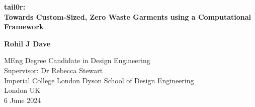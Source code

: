 \begin{titlepage}
    \begin{center}
        \vspace*{1cm}
        \Huge
        \textbf{tail0r: \\ Towards Custom-Sized, Zero Waste Garments using a Computational Framework}

 
        \vspace{1.5cm}
 
 
        \vfill
 
        
        \textbf{Rohil J Dave}
 
        \vspace{0.8cm}
 

 
        \Large
        MEng Degree Candidate in Design Engineering\\
        Supervisor: Dr Rebecca Stewart\\
        Imperial College London Dyson School of Design Engineering\\
        London UK\\
        6 June 2024
 
    \end{center}
\end{titlepage}